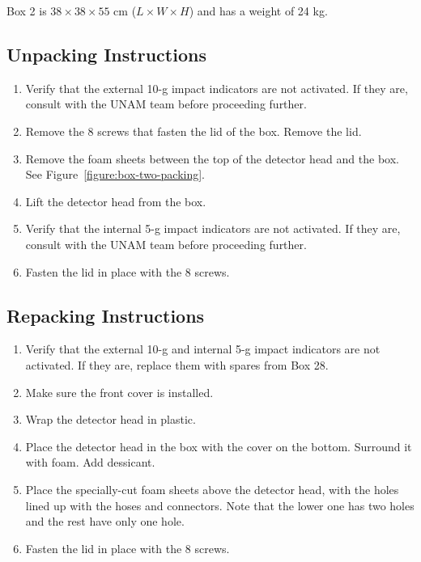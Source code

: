 \documentclass{article}
\begin{document}
Box 2 is $38 \times 38 \times 55$ cm ($L \times W \times H$) and has a weight of 24 kg.

\subsection{Unpacking Instructions}

\begin{enumerate}
\item Verify that the external 10-g impact indicators are not activated. If they are, consult with the UNAM team before proceeding further.
\item Remove the 8 screws that fasten the lid of the box. Remove the lid.
\item Remove the foam sheets between the top of the detector head and the box. See Figure~\ref{figure:box-two-packing}.
\item Lift the detector head from the box.
\item Verify that the internal 5-g impact indicators are not activated. If they are, consult with the UNAM team before proceeding further.
\item Fasten the lid in place with the 8 screws.
\end{enumerate}

\subsection{Repacking Instructions}

\begin{enumerate}
\item Verify that the external 10-g and internal 5-g impact indicators are not activated. If they are, replace them with spares from Box 28.
\item Make sure the front cover is installed.
\item Wrap the detector head in plastic.
\item Place the detector head in the box with the cover on the bottom. Surround it with foam. Add dessicant.
\item Place the specially-cut foam sheets above the detector head, with the holes lined up with the hoses and connectors. Note that the lower one has two holes and the rest have only one hole.
\item Fasten the lid in place with the 8 screws.
\end{enumerate}

\end{document}
